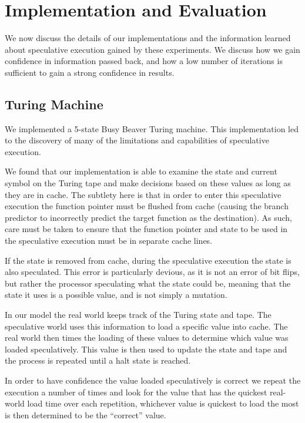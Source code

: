 
\section{Implementation and Evaluation}
We now discuss the details of our implementations and the information learned
about speculative execution gained by these experiments. We discuss how we gain
confidence in information passed back, and how a low number of iterations is
sufficient to gain a strong confidence in results.

\subsection{Turing Machine}
\label{subsec:impl-turing}

We implemented a 5-state Busy Beaver Turing machine.
This implementation led to the discovery of many of the limitations and
capabilities of speculative execution.

We found that our implementation is able to examine the state and current symbol
on the Turing tape and make decisions based on these values as long as they are
in cache. The subtlety here is that in order to enter this speculative execution
the function pointer must be flushed from cache (causing the branch predictor to
incorrectly predict the target function as the destination). As such, care must
be taken to ensure that the function pointer and state to be used in the
speculative execution must be in separate cache lines. 

If the state is removed from cache, during the speculative execution the
state is also speculated. This error is particularly devious, as it is not an
error of bit flips, but rather the processor speculating what the state could
be, meaning that the state it uses is a possible value, and is not simply a
mutation. 

In our model the real world keeps track of the Turing state and tape. The
speculative world uses this information to load a specific value into cache. The
real world then times the loading of these values to determine which value was
loaded speculatively. This value is then used to update the state and tape and
the process is repeated until a halt state is reached.

In order to have confidence the value loaded speculatively is correct we repeat
the execution a number of times and look for the value that has the quickest
real-world load time over each repetition, whichever value is quickest to load
the most is then determined to be the ``correct'' value.

